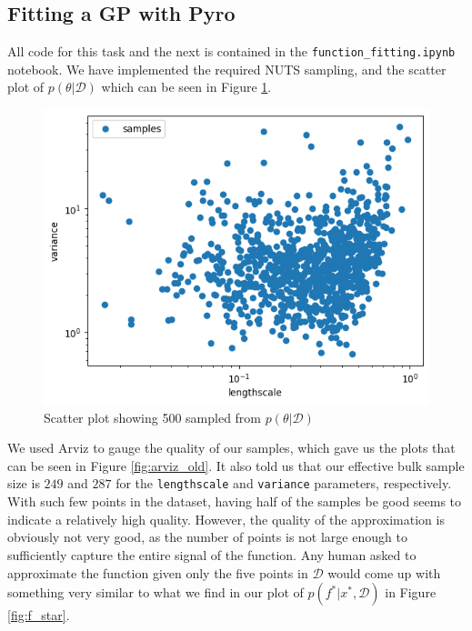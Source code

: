 \subsection{Fitting a GP with Pyro}
All code for this task and the next is contained in the \texttt{function\_fitting.ipynb} notebook. We have implemented the required NUTS sampling, and the scatter plot of $p(\theta | \mathcal{D})$ which can be seen in Figure \ref{fig:p_theta}.
\begin{figure}[h]
\centering
\includegraphics[width=0.5\linewidth]{images/p_theta.png}
\setlength{\belowcaptionskip}{-10pt}
\caption{Scatter plot showing 500 sampled from $p(\theta | \mathcal{D})$}
\label{fig:p_theta}
\end{figure}

We used Arviz to gauge the quality of our samples, which gave us the plots that can be seen in Figure \ref{fig:arviz_old}. It also told us that our effective bulk sample size is $249$ and $287$ for the \texttt{lengthscale} and \texttt{variance} parameters, respectively. With such few points in the dataset, having half of the samples be good seems to indicate a relatively high quality. However, the quality of the approximation is obviously not very good, as the number of points is not large enough to sufficiently capture the entire signal of the function. Any human asked to approximate the function given only the five points in $\mathcal{D}$ would come up with something very similar to what we find in our plot of $p(f^*|x^*,\mathcal{D})$ in Figure \ref{fig:f_star}.


